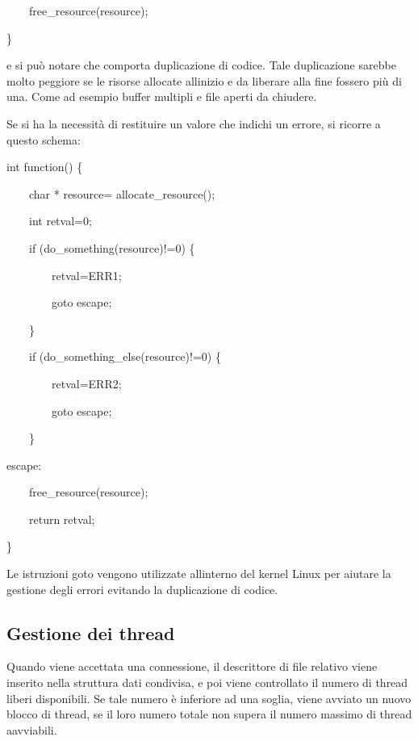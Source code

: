 \documentclass[a4paper,11pt]{article}
\begin{document}
{\ttfamily
\ \ \ \ free\_resource(resource);}

{\ttfamily
\}}


\bigskip

{\sffamily
e si pu\`o notare che comporta duplicazione di codice. Tale duplicazione
sarebbe molto peggiore se le risorse allocate
all{\textquotesingle}inizio e da liberare alla fine fossero pi\`u di
una. Come ad esempio buffer multipli e file aperti da chiudere.}


\bigskip

{\sffamily
Se si ha la necessit\`a di restituire un valore che indichi un errore,
si ricorre a questo schema:}

{\ttfamily
int function() \{}

{\ttfamily
\ \ \ \ char * resource= allocate\_resource();}

{\ttfamily
\ \ \ \ int retval=0;}


\bigskip

{\ttfamily
\ \ \ \ if (do\_something(resource)!=0) \{}

{\ttfamily
\ \ \ \ \ \ \ \ retval=ERR1;}

{\ttfamily
\ \ \ \ \ \ \ \ goto escape;}

{\ttfamily
\ \ \ \ \}}


\bigskip

{\ttfamily
\ \ \ \ if (do\_something\_else(resource)!=0) \{}

{\ttfamily
\ \ \ \ \ \ \ \ retval=ERR2;}

{\ttfamily
\ \ \ \ \ \ \ \ goto escape;}

{\ttfamily
\ \ \ \ \}}


\bigskip

{\ttfamily
escape:}

{\ttfamily
\ \ \ \ free\_resource(resource);}

{\ttfamily
\ \ \ \ return retval;}

{\ttfamily
\}}


\bigskip

{\sffamily
Le istruzioni goto vengono utilizzate all{\textquotesingle}interno del
kernel Linux per aiutare la gestione degli errori evitando la
duplicazione di codice\cite{KER01}. }


\bigskip

\subsection{Gestione dei thread}
{\sffamily
Quando viene accettata una connessione, il descrittore di file relativo
viene inserito nella struttura dati condivisa, e poi viene controllato
il numero di thread liberi disponibili. Se tale numero \`e inferiore ad
una soglia, viene avviato un nuovo blocco di thread, se il loro numero
totale non supera il numero massimo di thread aavviabili.}
\end{document}
